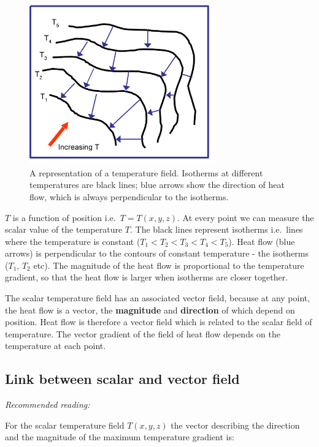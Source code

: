 \documentclass[
  letterpaper,
  DIV=11,
  numbers=noendperiod]{scrreprt}
\begin{document}
\begin{figure}[H]

{\centering \includegraphics[width=80mm,height=\textheight]{Figures/isotherms.png}

}

\caption{A representation of a temperature field. Isotherms at different
temperatures are black lines; blue arrows show the direction of heat
flow, which is always perpendicular to the isotherms.}

\end{figure}%

\(T\) is a function of position i.e.~\(T = T(x,y,z)\). At every point we
can measure the scalar value of the temperature \(T\). The black lines
represent isotherms i.e.~lines where the temperature is constant
(\(T_1 < T_2 < T_3 < T_4 < T_5\)). Heat flow (blue arrows) is
perpendicular to the contours of constant temperature - the isotherms
(\(T_1\), \(T_2\) etc). The magnitude of the heat flow is proportional
to the temperature gradient, so that the heat flow is larger when
isotherms are closer together.

The scalar temperature field has an associated vector field, because at
any point, the heat flow is a vector, the \textbf{magnitude} and
\textbf{direction} of which depend on position. Heat flow is therefore a
vector field which is related to the scalar field of temperature. The
vector gradient of the field of heat flow depends on the temperature at
each point.

\subsection{Link between scalar and vector
field}\label{link-between-scalar-and-vector-field}

\emph{Recommended reading:}

For the scalar temperature field \(T(x,y,z)\) the vector describing the
direction and the magnitude of the maximum temperature gradient is:
\end{document}

